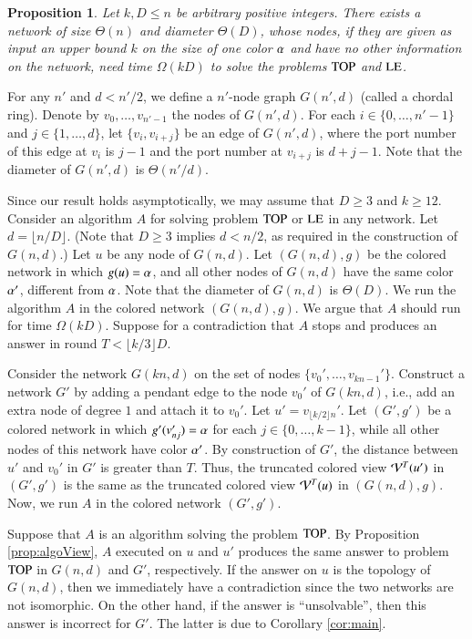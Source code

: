 \documentclass[a4paper,10pt]{article}
\newtheorem{proposition}{Proposition}[section]
\newcommand{\view}[1][]{\if!#1!\mathcal{V}\else\mathcal{V}^{#1}\fi}
\newcommand{\problemLE}{\textup{LE}}
\newcommand{\problemTOP}{\textup{TOP}}
\newenvironment{proof}[1][Proof]
{\par\noindent{\bf #1:} }{\hspace*{\fill}\nolinebreak{$\Box$}\bigskip\par}
\begin{document}
 
\begin{proposition}\label{first-lb}
Let $k,D \leq n$ be arbitrary positive integers.
There exists a network of size $\Theta(n)$ and diameter $\Theta(D)$, whose nodes, if they are given as input an upper bound $k$ on the size of one color $\alpha$ and have no other information on the network, need time  $\Omega(kD)$ to solve the problems $\problemTOP$ and $\problemLE$.
\end{proposition}
\begin{proof}
For any $n'$ and $d<n'/2$, we define a $n'$-node graph $G(n',d)$ (called a chordal ring).
Denote by $v_{0},\ldots,v_{n'-1}$ the nodes of $G(n',d)$.
For each $i\in\{0,\ldots,n'-1\}$ and $j\in\{1,\ldots,d\}$, let $\{v_{i},v_{i+j}\}$ be an edge of $G(n',d)$, where the port number of this edge at $v_i$ is $j-1$ and the port number at $v_{i+j}$ is $d+j-1$.
Note that the diameter of $G(n',d)$ is $\Theta(n'/d)$.

Since our result {holds asymptotically}, we may assume that $D\geq 3$ and $k\geq 12$.
Consider an algorithm $A$ for solving problem $\problemTOP$ or $\problemLE$ in any network.
Let $d=\lfloor n/D\rfloor$.
(Note that $D\geq 3$ implies $d<n/2$, as required in the construction of $G(n,d)$.)
Let $u$ be any node of $G(n,d)$.
Let $(G(n,d),g)$ be the colored network in which $g(u)=\alpha$, and all other nodes of $G(n,d)$ have the same color $\alpha'$, different from $\alpha$.
Note that the diameter of $G(n,d)$ is $\Theta(D)$.
We run the algorithm $A$ in the colored network $(G(n,d),g)$.
We argue that $A$ should run for time $\Omega(kD)$.
Suppose for a contradiction that $A$ stops and produces an answer in round $T<\lfloor k/3\rfloor D$.

Consider the network $G(kn,d)$ on the set of nodes $\{v_0',\ldots,v_{kn-1}'\}$.
Construct a network $G'$ by adding a pendant edge to the node $v_0'$ of $G(kn,d)$, i.e., add an extra node of degree $1$ and attach it to $v_0'$.
Let $u'=v_{\lfloor k/2\rfloor n}'$.
Let $(G',g')$ be a colored network in which $g'(v_{nj}')=\alpha$ for each $j\in\{0,\ldots,k-1\}$, while all other nodes of this network have color $\alpha'$.
By construction of $G'$, the distance between $u'$ and $v_0'$ in $G'$ is greater than $T$.
Thus, the truncated colored view $\view[T](u')$ in $(G',g')$ is the same as the truncated colored view $\view[T](u)$ in $(G(n,d),g)$.
Now, we run $A$ in the colored network $(G',g')$.

Suppose that $A$ is an algorithm solving the problem $\problemTOP$.
By Proposition \ref{prop:algoView}, $A$ executed on $u$ and $u'$ produces the same answer to problem $\problemTOP$ in $G(n,d)$ and $G'$, respectively.
If the answer on $u$ is the topology of $G(n,d)$, then we immediately have a contradiction since the two networks are not isomorphic.
On the other hand, if the answer is ``unsolvable'', then this answer is incorrect for $G'$.
The latter is due to Corollary \ref{cor:main}.


\end{proof}
\end{document}

